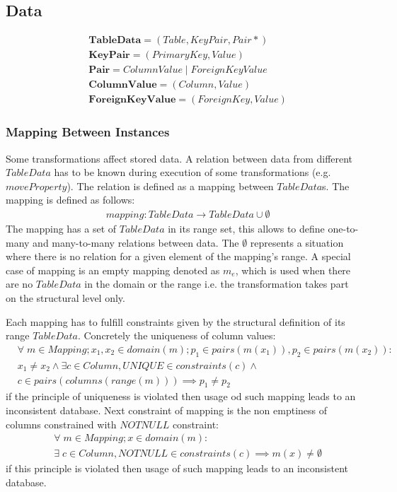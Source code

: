\documentclass[10pt]{article}
\begin{document}
\subsection{Data}
\begin{align}
&	\mathbf{TableData} = (Table, KeyPair, Pair*) \\
&   \mathbf{KeyPair} = (PrimaryKey, Value) \\
&	\mathbf{Pair} = ColumnValue \; | \; ForeignKeyValue \\
&   \mathbf{ColumnValue} = (Column, Value) \\
&   \mathbf{ForeignKeyValue} = (ForeignKey, Value)
\end{align}

\subsubsection{Mapping Between Instances}
Some transformations affect stored data. A relation between data from different $TableData$ has to be known during execution of some transformations (e.g. $moveProperty$). The relation is defined as a mapping between $TableData$s. The mapping is defined as follows:
\begin{align}
& mapping: TableData \rightarrow TableData \cup \emptyset %
\end{align}
The mapping has a set of $TableData$ in its range set, this allows to define one-to-many and many-to-many relations between data. The $\emptyset$ represents a situation where there is no relation for a given element of the mapping's range. A special case of mapping is an empty mapping denoted as $m_e$, which is used when there are no $TableData$ in the domain or the range i.e. the transformation takes part on the structural level only.

Each mapping has to fulfill constraints given by the structural definition of its range $TableData$. Concretely the uniqueness of column values:
\begin{align}
& \forall \; m \in Mapping;  x_1, x_2 \in domain(m); p_1 \in pairs(m(x_1)),  p_2 \in pairs(m(x_2)): \nonumber \\ 
&  x_1 \neq x_2 \land \exists c \in Column, UNIQUE \in constraints(c) \land \nonumber \\ 
&c \in pairs(columns(range(m))) \implies  p_1 \neq p_2
\end{align}
if the principle of uniqueness is violated then usage od such mapping leads to an inconsistent database. Next constraint of mapping is the non emptiness of columns constrained with $NOTNULL$ constraint:
\begin{align}
& \forall \; m \in Mapping;  x \in domain(m) :  \nonumber \\
& \exists \; c \in Column, NOTNULL \in constraints(c) \implies m(x) \neq \emptyset
\end{align}
if this principle is violated then usage of such mapping leads to an inconsistent database. 
\end{document}
